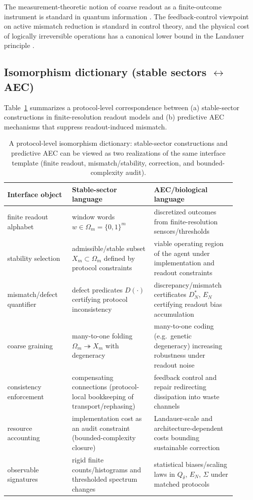 The measurement-theoretic notion of coarse readout as a finite-outcome instrument is standard in quantum information \cite{NielsenChuang2010}.
The feedback-control viewpoint on active mismatch reduction is standard in control theory, and the physical cost of logically irreversible operations has a canonical lower bound in the Landauer principle \cite{AstromMurray2008FeedbackSystems,Landauer1961}.

\subsection{Isomorphism dictionary (stable sectors \texorpdfstring{$\leftrightarrow$}{<->} AEC)}
Table~\ref{tab:isomorphism_dictionary} summarizes a protocol-level correspondence between (a) stable-sector constructions in finite-resolution readout models and (b) predictive AEC mechanisms that suppress readout-induced mismatch.

\begin{table}[t]
\centering
\small
\setlength{\tabcolsep}{6pt}
\renewcommand{\arraystretch}{1.15}
\begin{tabular}{p{0.26\linewidth}p{0.33\linewidth}p{0.33\linewidth}}
\toprule
Interface object & Stable-sector language & AEC/biological language \\
\midrule
finite readout alphabet & window words $w\in\Omega_m=\{0,1\}^m$ & discretized outcomes from finite-resolution sensors/thresholds \\
stability selection & admissible/stable subset $X_m\subset\Omega_m$ defined by protocol constraints & viable operating region of the agent under implementation and readout constraints \\
mismatch/defect quantifier & defect predicates $D(\cdot)$ certifying protocol inconsistency & discrepancy/mismatch certificates $D_N^\ast$, $E_N$ certifying readout bias accumulation \\
coarse graining & many-to-one folding $\Omega_m\twoheadrightarrow X_m$ with degeneracy & many-to-one coding (e.g.\ genetic degeneracy) increasing robustness under readout noise \\
consistency enforcement & compensating connections (protocol-local bookkeeping of transport/rephasing) & feedback control and repair redirecting dissipation into waste channels \\
resource accounting & implementation cost as an audit constraint (bounded-complexity closure) & Landauer-scale and architecture-dependent costs bounding sustainable correction \\
observable signatures & rigid finite counts/histograms and thresholded spectrum changes & statistical biases/scaling laws in $Q_\delta$, $E_N$, $\Sigma$ under matched protocols \\
\bottomrule
\end{tabular}
\caption{A protocol-level isomorphism dictionary: stable-sector constructions and predictive AEC can be viewed as two realizations of the same interface template (finite readout, mismatch/stability, correction, and bounded-complexity audit).}
\label{tab:isomorphism_dictionary}
\end{table}

